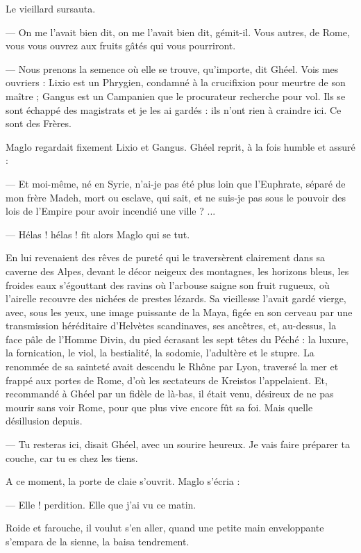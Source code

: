 \documentclass[a4paper, 11pt, oneside, polutonikogreek, french]{article}
\begin{document}
Le vieillard sursauta.

--- On me l'avait bien dit, on me l'avait bien dit, gémit-il. Vous autres, de Rome, vous vous ouvrez aux fruits gâtés qui vous pourriront.

--- Nous prenons la semence où elle se trouve, qu'importe, dit Ghéel. Vois mes ouvriers : Lixio est un Phrygien, condamné à la crucifixion pour meurtre de son maître ; Gangus est un Campanien que le procurateur recherche pour vol. Ils se sont échappé des magistrats et je les ai gardés : ils n'ont rien à craindre ici. Ce sont des Frères.

Maglo regardait fixement Lixio et Gangus. Ghéel reprit, à la fois humble et assuré :

--- Et moi-même, né en Syrie, n'ai-je pas été plus loin que l'Euphrate, séparé de mon frère Madeh, mort ou esclave, qui sait, et ne suis-je pas sous le pouvoir des lois de l'Empire pour avoir incendié une ville ? ...

--- Hélas ! hélas ! fit alors Maglo qui se tut.

En lui revenaient des rêves de pureté qui le traversèrent clairement dans sa caverne des Alpes, devant le décor neigeux des montagnes, les horizons bleus, les froides eaux s'égouttant des ravins où l'arbouse saigne son fruit rugueux, où l'airelle recouvre des nichées de prestes lézards. Sa vieillesse l'avait gardé vierge, avec, sous les yeux, une image puissante de la Maya, figée en son cerveau par une transmission héréditaire d'Helvètes scandinaves, ses ancêtres, et, au-dessus, la face pâle de l'Homme Divin, du pied écrasant les sept têtes du Péché : la luxure, la fornication, le viol, la bestialité, la sodomie, l'adultère et le stupre. La renommée de sa sainteté avait descendu le Rhône par Lyon, traversé la mer et frappé aux portes de Rome, d'où les sectateurs de Kreistos l'appelaient. Et, recommandé à Ghéel par un fidèle de là-bas, il était venu, désireux de ne pas mourir sans voir Rome, pour que plus vive encore fût sa foi. Mais quelle désillusion depuis.

--- Tu resteras ici, disait Ghéel, avec un sourire heureux. Je vais faire préparer ta couche, car tu es chez les tiens.

A ce moment, la porte de claie s'ouvrit. Maglo s'écria :

--- Elle ! perdition. Elle que j'ai vu ce matin.

Roide et farouche, il voulut s'en aller, quand une petite main enveloppante s'empara de la sienne, la baisa tendrement.
\end{document}
